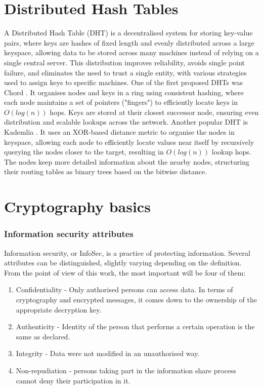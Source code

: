 \section{Distributed Hash Tables}
A Distributed Hash Table (DHT) is a decentralised system for storing key-value pairs, where keys are hashes of fixed length and evenly distributed across a large keyspace, allowing data to be stored across many machines instead of relying on a single central server. This distribution improves reliability, avoids single point failure, and eliminates the need to trust a single entity, with various strategies used to assign keys to specific machines.
One of the first proposed DHTs was Chord \cite{chord}. It organises nodes and keys in a ring using consistent hashing, where each node maintains a set of pointers ("fingers") to efficiently locate keys in $O(log (n))$ hops. Keys are stored at their closest successor node, ensuring even distribution and scalable lookups across the network.
Another popular DHT is Kademlia \cite{kademlia}. It uses an XOR-based distance metric to organise the nodes in keyspace, allowing each node to efficiently locate values near itself by recursively querying the nodes closer to the target, resulting in $O(log (n))$ lookup hops. The nodes keep more detailed information about the nearby nodes, structuring their routing tables as binary trees based on the bitwise distance.

\section{Cryptography basics}

\subsubsection{Information security attributes}
Information security, or InfoSec, is a practice of protecting information. Several attributes can be distinguished, slightly varying depending on the definition. From the point of view of this work, the most important will be four of them:
\begin{enumerate}
    \item Confidentiality - Only authorised persons can access data. In terms of cryptography and encrypted messages, it comes down to the ownership of the appropriate decryption key.
    \item Authenticity - Identity of the person that performs a certain operation is the same as declared.
    \item Integrity - Data were not modified in an unauthorised way.
    \item Non-repudiation - persons taking part in the information share process cannot deny their participation in it.
\end{enumerate}

